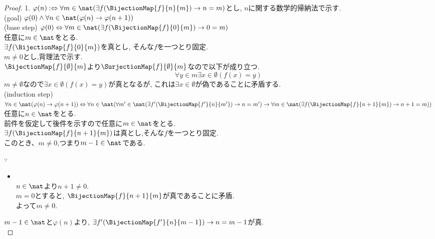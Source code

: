 \begin{proof} 
1. $\varphi (n) :\Leftrightarrow \forall m \in \nat (\exists f(\BijectionMap{f}{n}{m}) \rightarrow n = m)$とし,
$n$に関する数学的帰納法で示す.\\

(goal) $\varphi (0) \land \forall n \in \nat ( \varphi (n) \rightarrow \varphi (n+1))$\\

(base step) $\varphi (0) \Leftrightarrow  \forall m \in \nat  (\exists f(\BijectionMap{f}{0}{m}) \rightarrow 0 = m)$ \\
任意に$m \in \nat$をとる.\\
$\exists f(\BijectionMap{f}{0}{m})$を真とし,
そんな$f$を一つとり固定.\\
$m \neq 0$とし,背理法で示す.\\
$\BijectionMap{f}{\emptyset}{m}$より$\SurjectionMap{f}{\emptyset}{m}$なので以下が成り立つ.
\begin{equation*}
\forall y \in m \exists x \in \emptyset (f(x) = y)
\end{equation*}
$m \neq \emptyset$なので$\exists x \in \emptyset (f(x) = y)$が真となるが,
これは$\exists x \in \emptyset$が偽であることに矛盾する.\\

(induction step) $\forall n \in \nat ( \varphi (n) \rightarrow \varphi (n+1)) \\
\Leftrightarrow \forall n \in \nat(\forall m' \in \nat  (\exists f'(\BijectionMap{f'}{n}{m'}) \rightarrow  n = m') \rightarrow 
\forall m \in \nat  (\exists f(\BijectionMap{f}{n+1}{m}) \rightarrow  n+1 = m))$ \\

任意に$n \in \nat$をとる.\\
前件を仮定して後件を示すので任意に$m \in \nat$をとる.\\
$\exists f(\BijectionMap{f}{n+1}{m})$は真とし,そんな$f$を一つとり固定.\\
このとき、$m \neq 0$,つまり$m-1 \in \nat$である.\\

\begin{sub-block}{{\boldmath $\because$}\,}
\begin{itemize}
\item[] \hspace{-0.5cm} \\
$n \in \nat$より$n+1 \neq 0$.\\
$m = 0$とすると,
$\BijectionMap{f}{n+1}{m}$が真であることに矛盾.\\
よって$m \neq 0$.
\end{itemize}
\end{sub-block}
$m-1 \in \nat$と$\varphi (n)$より,
$ \exists f'(\BijectionMap{f'}{n}{m-1})\rightarrow  n = m-1$が真.\\


\end{proof}
